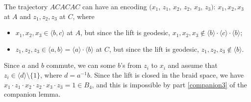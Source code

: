 \documentclass[a4paper,10pt]{article}
\begin{document}
The trajectory $ACACAC$ can have an encoding $(x_1$, $z_1$, $x_2$, $z_2$, $x_3$, $z_3)$: $x_1,x_2,x_3$ at $A$ and $z_1,z_2,z_3$ at $C$, where
\begin{itemize}
 \item $x_1,x_2,x_3\in \langle b,c\rangle$ at $A$, but since the lift is geodesic, $x_1,x_2,x_3\notin\langle b\rangle\cdot\langle c\rangle\cdot\langle b\rangle$;
 \item $z_1,z_2,z_3\in \langle a,b\rangle=\langle a\rangle\cdot\langle b\rangle$ at $C$, but since the lift is geodesic, $z_1,z_2,z_3\notin \langle b\rangle$.
\end{itemize}
Since $a$ and $b$ commute, we can some $b$'s from $z_i$ to $x_i$ and assume that $z_i\in \langle d\rangle\setminus\{1\}$, where $d=a^{-1}b$.
Since the lift is closed in the braid space, we have $x_1\cdot z_1\cdot x_2\cdot z_2\cdot x_3\cdot z_3 =1\in B_4$, and this is impossible by part \ref{companion3} of the companion lemma.

{\sloppy
\def\emph{\textit}
\printbibliography[heading=bibintoc]
\fussy
}
\end{document}
